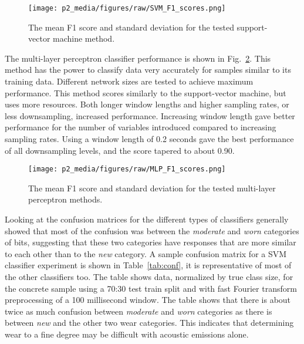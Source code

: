 \begin{figure}[h]
\centering
\texttt{[image: p2\_media/figures/raw/SVM\_F1\_scores.png]}
\caption{The mean F1 score and standard deviation for the tested support-vector machine method.
}
\label{fig:perf_SVM}
\end{figure}

The multi-layer perceptron classifier performance is shown in Fig.~\ref{fig:perf_MLP}.
This method has the power to classify data very accurately for samples similar to its training data.
Different network sizes are tested to achieve maximum performance.
This method scores similarly to the support-vector machine, but uses more resources.
Both longer window lengths and higher sampling rates, or less downsampling, increased performance.
Increasing window length gave better performance for the number of variables introduced
compared to increasing sampling rates.
Using a window length of 0.2 seconds gave the best performance of all downsampling levels,
and the score tapered to about 0.90.

\begin{figure}[h]
\centering
\texttt{[image: p2\_media/figures/raw/MLP\_F1\_scores.png]}
\caption{
The mean F1 score and standard deviation for the tested multi-layer perceptron methods.
}
\label{fig:perf_MLP}
\end{figure}


Looking at the confusion matrices for the different types of classifiers generally showed
that most of the confusion was between the \textit{moderate} and \textit{worn} categories of bits, suggesting that
these two categories have responses that are more similar to each other than to the \textit{new} category.
A sample confusion matrix for a SVM classifier experiment is shown in Table~\ref{tab:conf}, 
it is representative of most of the other classifiers too. 
The table shows data, normalized by true class size, for the concrete sample using a 70:30 test train split
and with fast Fourier transform preprocessing of a 100 millisecond window.
The table shows that there is about twice as much confusion between \textit{moderate} and \textit{worn} categories as there is 
between \textit{new} and the other two wear categories.
This indicates that determining wear to a fine degree may be difficult with acoustic emissions alone.

